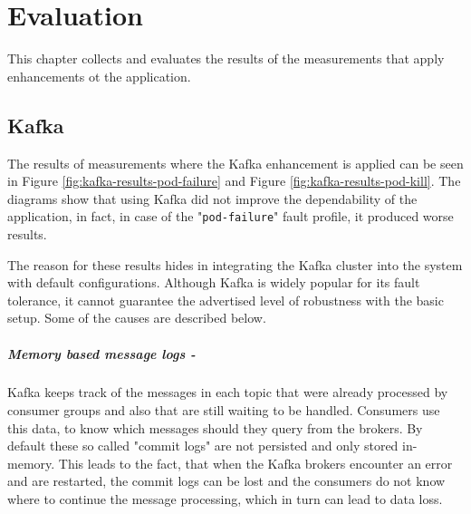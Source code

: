 \chapter{Evaluation} \label{evaluation}

This chapter collects and evaluates the results of the measurements that apply enhancements ot the application. 


\section{Kafka}

The results of measurements where the Kafka enhancement is applied can be seen in Figure \ref{fig:kafka-results-pod-failure} and Figure \ref{fig:kafka-results-pod-kill}. The diagrams show that using Kafka did not improve the dependability of the application, in fact, in case of the "\texttt{pod-failure}" fault profile, it produced worse results.

The reason for these results hides in integrating the Kafka cluster into the system with default configurations. Although Kafka is widely popular for its fault tolerance, it cannot guarantee the advertised level of robustness with the basic setup. Some of the causes are described below.

\paragraph{Memory based message logs -}Kafka keeps track of the messages in each topic that were already processed by consumer groups and also that are still waiting to be handled. Consumers use this data, to know which messages should they query from the brokers. By default these so called "commit logs" are not persisted and only stored in-memory. This leads to the fact, that when the Kafka brokers encounter an error and are restarted, the commit logs can be lost and the consumers do not know where to continue the message processing, which in turn can lead to data loss.

